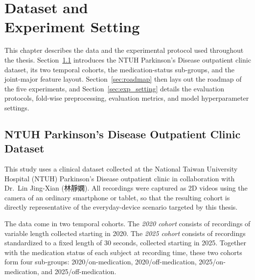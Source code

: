 
\setlength{\parskip}{4pt}

\chapter[Dataset and Experiment Setting]{Dataset and \\ Experiment Setting}
\label{chap:setup}

This chapter describes the data and the experimental protocol used throughout the thesis. Section~\ref{sec:dataset} introduces the NTUH Parkinson's Disease outpatient clinic dataset, its two temporal cohorts, the medication-status sub-groups, and the joint-major feature layout. Section~\ref{sec:roadmap} then lays out the roadmap of the five experiments, and Section~\ref{sec:exp_setting} details the evaluation protocols, fold-wise preprocessing, evaluation metrics, and model hyperparameter settings.

\section{NTUH Parkinson's Disease Outpatient Clinic Dataset}
\label{sec:dataset}

This study uses a clinical dataset collected at the National Taiwan University Hospital (NTUH) Parkinson's Disease outpatient clinic in collaboration with Dr.~Lin Jing-Xian (林靜嫻). All recordings were captured as 2D videos using the camera of an ordinary smartphone or tablet, so that the resulting cohort is directly representative of the everyday-device scenario targeted by this thesis.

The data come in two temporal cohorts. The \emph{2020 cohort} consists of recordings of variable length collected starting in 2020. The \emph{2025 cohort} consists of recordings standardized to a fixed length of 30 seconds, collected starting in 2025. Together with the medication status of each subject at recording time, these two cohorts form four sub-groups: 2020/on-medication, 2020/off-medication, 2025/on-medication, and 2025/off-medication.

